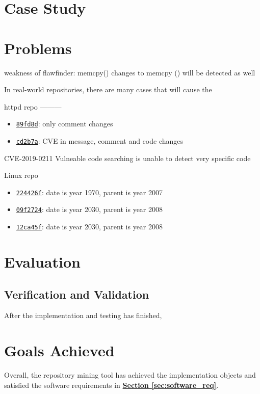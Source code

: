 \documentclass[12pt, a4paper]{report}
\begin{document}
\section{Case Study}

\section{Problems}
weakness of flawfinder:
memcpy() changes to memcpy () will be detected as well

In real-world repositories, there are many cases that will cause the

httpd repo
---------
\begin{itemize}
  \item \href{https://github.com/apache/httpd/commit/89fd8d}{\texttt{89fd8d}}: only comment changes
  \item \href{https://github.com/apache/httpd/commit/cd2b7a}{\texttt{cd2b7a}}: CVE in message,
  comment and code changes
\end{itemize}

CVE-2019-0211
Vulneable code searching is unable to detect very specific code

Linux repo
\begin{itemize}
  \item \href{https://github.com/torvalds/linux/commit/224426f}{\texttt{224426f}}: date is year
  1970, parent is year 2007
  \item \href{https://github.com/torvalds/linux/commit/09f2724}{\texttt{09f2724}}: date is year
  2030, parent is year 2008
  \item \href{https://github.com/torvalds/linux/commit/12ca45f}{\texttt{12ca45f}}: date is year
  2030, parent is year 2008
\end{itemize}

\section{Evaluation}

\subsection{Verification and Validation}
After the implementation and testing has finished,

\section{Goals Achieved}
Overall, the repository mining tool has achieved the implementation objects and satisfied the
software requirements in \hyperref[sec:software_req]{\textbf{Section \ref*{sec:software_req}}}.
\end{document}
